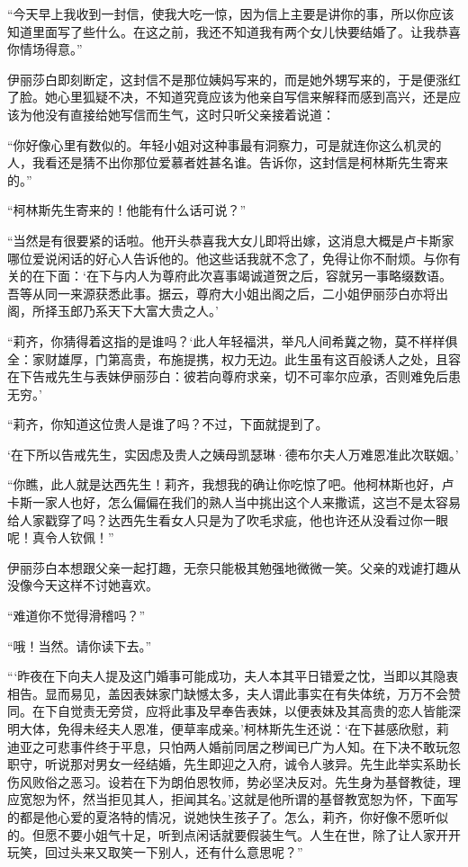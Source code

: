 \par “今天早上我收到一封信，使我大吃一惊，因为信上主要是讲你的事，所以你应该知道里面写了些什么。在这之前，我还不知道我有两个女儿快要结婚了。让我恭喜你情场得意。”
\par 伊丽莎白即刻断定，这封信不是那位姨妈写来的，而是她外甥写来的，于是便涨红了脸。她心里狐疑不决，不知道究竟应该为他亲自写信来解释而感到高兴，还是应该为他没有直接给她写信而生气，这时只听父亲接着说道：
\par “你好像心里有数似的。年轻小姐对这种事最有洞察力，可是就连你这么机灵的人，我看还是猜不出你那位爱慕者姓甚名谁。告诉你，这封信是柯林斯先生寄来的。”
\par “柯林斯先生寄来的！他能有什么话可说？”
\par “当然是有很要紧的话啦。他开头恭喜我大女儿即将出嫁，这消息大概是卢卡斯家哪位爱说闲话的好心人告诉他的。他这些话我就不念了，免得让你不耐烦。与你有关的在下面：‘在下与内人为尊府此次喜事竭诚道贺之后，容就另一事略缀数语。吾等从同一来源获悉此事。据云，尊府大小姐出阁之后，二小姐伊丽莎白亦将出阁，所择玉郎乃系天下大富大贵之人。’
\par “莉齐，你猜得着这指的是谁吗？‘此人年轻福洪，举凡人间希冀之物，莫不样样俱全：家财雄厚，门第高贵，布施提携，权力无边。此生虽有这百般诱人之处，且容在下告戒先生与表妹伊丽莎白：彼若向尊府求亲，切不可率尔应承，否则难免后患无穷。’
\par “莉齐，你知道这位贵人是谁了吗？不过，下面就提到了。
\par ‘在下所以告戒先生，实因虑及贵人之姨母凯瑟琳·德布尔夫人万难恩准此次联姻。’
\par “你瞧，此人就是达西先生！莉齐，我想我的确让你吃惊了吧。他柯林斯也好，卢卡斯一家人也好，怎么偏偏在我们的熟人当中挑出这个人来撒谎，这岂不是太容易给人家戳穿了吗？达西先生看女人只是为了吹毛求疵，他也许还从没看过你一眼呢！真令人钦佩！”
\par 伊丽莎白本想跟父亲一起打趣，无奈只能极其勉强地微微一笑。父亲的戏谑打趣从没像今天这样不讨她喜欢。
\par “难道你不觉得滑稽吗？”
\par “哦！当然。请你读下去。”
\par “‘昨夜在下向夫人提及这门婚事可能成功，夫人本其平日错爱之忱，当即以其隐衷相告。显而易见，盖因表妹家门缺憾太多，夫人谓此事实在有失体统，万万不会赞同。在下自觉责无旁贷，应将此事及早奉告表妹，以便表妹及其高贵的恋人皆能深明大体，免得未经夫人恩准，便草率成亲。’柯林斯先生还说：‘在下甚感欣慰，莉迪亚之可悲事件终于平息，只怕两人婚前同居之秽闻已广为人知。在下决不敢玩忽职守，听说那对男女一经结婚，先生即迎之入府，诚令人骇异。先生此举实系助长伤风败俗之恶习。设若在下为朗伯恩牧师，势必坚决反对。先生身为基督教徒，理应宽恕为怀，然当拒见其人，拒闻其名。’这就是他所谓的基督教宽恕为怀，下面写的都是他心爱的夏洛特的情况，说她快生孩子了。怎么，莉齐，你好像不愿听似的。但愿不要小姐气十足，听到点闲话就要假装生气。人生在世，除了让人家开开玩笑，回过头来又取笑一下别人，还有什么意思呢？”
